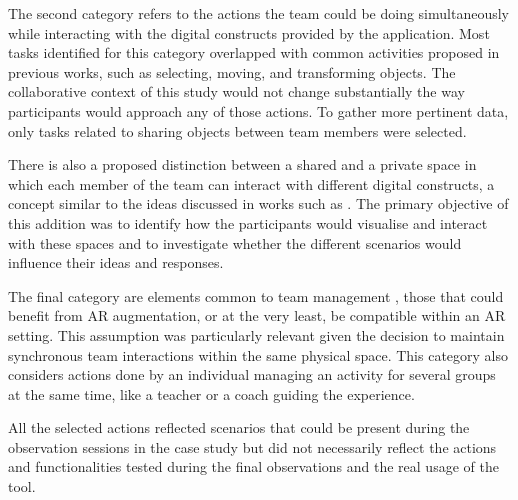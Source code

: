 The second category refers to the actions the team could be doing simultaneously while interacting with the digital constructs provided by the application. Most tasks identified for this
category overlapped with common activities proposed in previous works, such as selecting, moving, and transforming objects. The collaborative context of this study would not change
substantially the way participants would approach any of those actions. To gather more pertinent data, only tasks related to sharing objects between team members were selected.

There is also a proposed distinction between a shared and a private space in which each member of the team can interact with different digital constructs, a concept similar to the ideas
discussed in works such as \textcite{reilly_2014,lebeck_2018}. The primary objective of this addition was to identify how the participants would visualise and interact with these spaces
and to investigate whether the different scenarios would influence their ideas and responses.

The final category are elements common to team management \parencite{zigurs_2006}, those that could benefit from \ac{AR} augmentation, or at the very least, be compatible within an \ac{AR}
setting. This assumption was particularly relevant given the decision to maintain synchronous team interactions within the same physical space. This category also considers actions done by
an individual managing an activity for several groups at the same time, like a teacher or a coach guiding the experience.

All the selected actions reflected scenarios that could be present during the observation sessions in the case study but did not necessarily reflect the actions and functionalities tested
during the final observations and the real usage of the tool.

